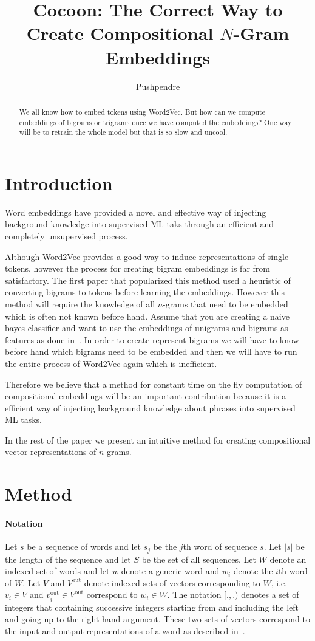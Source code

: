 \documentclass{article}
\title{Cocoon: The Correct Way to Create Compositional $N$-Gram Embeddings}
\author{Pushpendre}
\newcommand{\Vo}{V^{\textrm{out}}}
\newcommand{\vo}[1]{v^{\textrm{out}}_{#1}}
\newcommand{\wv}{Word2Vec\xspace}
\begin{document}
\maketitle
\begin{abstract}
We all know how to embed tokens using \wv. But how can we compute
embeddings of bigrams or trigrams once we have computed the embeddings?
One way will be to retrain the whole model but that is so slow and uncool.

\end{abstract}
\section{Introduction}
\label{sec:introduction}
Word embeddings have provided a novel and effective way of injecting background
knowledge into supervised ML taks through an efficient and completely
unsupervised process.

Although \wv provides a good way to induce representations of single
tokens, however the process for creating bigram embeddings is far from
satisfactory. The first paper that popularized this method used a heuristic of
converting bigrams to tokens before learning the embeddings. However this method
will require the knowledge of all $n$-grams that need to be embedded which is
often not known before hand. Assume that you are creating a naive bayes
classifier and want to use the embeddings of unigrams and bigrams as features as
done in~\cite{wang2012baselines}. In order to create represent bigrams we
will have to know before hand which bigrams need to be embedded and then we will
have to run the entire process of \wv again which is inefficient.

Therefore we believe that a method for constant time on the fly computation of
compositional embeddings will be an important contribution because it is a efficient
way of injecting background knowledge about phrases into supervised ML tasks.

In the rest of the paper we present an intuitive method for creating compositional vector
representations of $n$-grams.

\section{Method}
\label{sec:method}
\paragraph{Notation} Let $s$ be a sequence of words and let $s_j$ be the $j$th word of sequence $s$.
Let $|s|$ be the length of the sequence and let $S$ be the set of all sequences.
Let $W$ denote an indexed set of words and
let $w$ denote a generic word and $w_i$ denote the $i$th word of $W$.
Let $V$ and $\Vo$ denote indexed sets of vectors corresponding to $W$,
i.e. $v_i \in V$ and $\vo{i} \in \Vo$ correspond to $w_i \in W$. The notation
$[., .)$ denotes a set of integers that containing successive integers starting
from and including the left  and going up to the right hand argument.
These two sets
of vectors correspond to the input and output representations of a word as
described in~\cite{mikolov2013distributed}.
\end{document}
